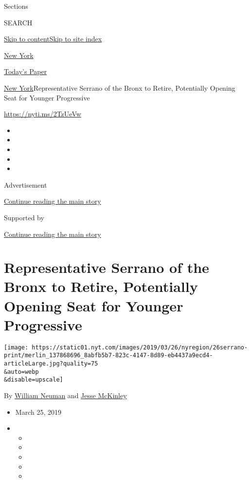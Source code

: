 Sections

SEARCH

\protect\hyperlink{site-content}{Skip to
content}\protect\hyperlink{site-index}{Skip to site index}

\href{https://www.nytimes.com/section/nyregion}{New York}

\href{https://myaccount.nytimes.com/auth/login?response_type=cookie\&client_id=vi}{}

\href{https://www.nytimes.com/section/todayspaper}{Today's Paper}

\href{/section/nyregion}{New York}\textbar{}Representative Serrano of
the Bronx to Retire, Potentially Opening Seat for Younger Progressive

\url{https://nyti.ms/2TzUeVw}

\begin{itemize}
\item
\item
\item
\item
\item
\end{itemize}

Advertisement

\protect\hyperlink{after-top}{Continue reading the main story}

Supported by

\protect\hyperlink{after-sponsor}{Continue reading the main story}

\hypertarget{representative-serrano-of-the-bronx-to-retire-potentially-opening-seat-for-younger-progressive}{%
\section{Representative Serrano of the Bronx to Retire, Potentially
Opening Seat for Younger
Progressive}\label{representative-serrano-of-the-bronx-to-retire-potentially-opening-seat-for-younger-progressive}}

\texttt{[image: https://static01.nyt.com/images/2019/03/26/nyregion/26serrano-print/merlin\_137868696\_8abfb5b7-823c-4147-8d89-eb4437a9ecd4-articleLarge.jpg?quality=75\\\&auto=webp\\\&disable=upscale]}

By \href{https://www.nytimes.com/by/william-neuman}{William Neuman} and
\href{https://www.nytimes.com/by/jesse-mckinley}{Jesse McKinley}

\begin{itemize}
\item
  March 25, 2019
\item
  \begin{itemize}
  \item
  \item
  \item
  \item
  \item
  \end{itemize}
\end{itemize}

